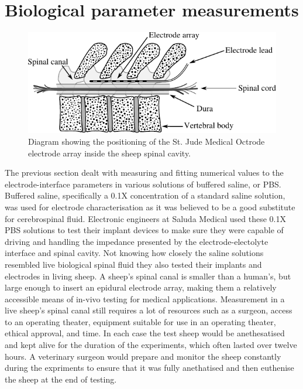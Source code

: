 \section{Biological parameter measurements}
  \label{sect:sheep_measurements}

  \begin{figure}
    \centering
    \includegraphics{content/pt2/08-InterfaceParameters/graphics/sheepSpine}
    \caption{\label{fig:sheepSpine} Diagram showing the positioning of the St. Jude Medical Octrode electrode array inside the sheep spinal cavity.}
  \end{figure}

  The previous section dealt with measuring and fitting numerical values to the electrode-interface parameters in various solutions of buffered saline, or PBS.
  Buffered saline, specifically a 0.1X concentration of a standard saline solution, was used for electrode characterisation as it was believed to be a good substitute for cerebrospinal fluid.
  Electronic engineers at Saluda Medical used these 0.1X PBS solutions to test their implant devices to make sure they were capable of driving and handling the impedance presented by the electrode-electolyte interface and spinal cavity.
  Not knowing how closely the saline solutions resembled live biological spinal fluid they also tested their implants and electrodes in living sheep.
  A sheep's spinal canal is smaller than a human's, but large enough to insert an epidural electrode array, making them a relatively accessible means of in-vivo testing for medical applications.
  Measurement in a live sheep's spinal canal still requires a lot of resources such as a surgeon, access to an operating theater, equipment suitable for use in an operating theater, ethical approval, and time.
  In each case the test sheep would be anethesatised and kept alive for the duration of the experiments, which often lasted over twelve hours.
  A veterinary surgeon would prepare and monitor the sheep constantly during the expriments to ensure that it was fully anethatised and then euthenise the sheep at the end of testing.

